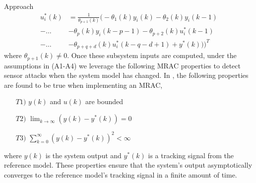 \begin{section}{Approach}
	\begin{equation}
	\begin{split}
	\label{eq:End}
	u^*_i(k)&=\frac{1}{\theta_{p+1}(k)}\big(-\theta_1(k)y_i(k)-\theta_2(k)y_i(k-1)  \\
    -\dots &-\theta_p(k)y_i(k-p-1)-\theta_{p+2}(k)u^*_i(k-1)  \\
	- \dots &- \theta_{p+q+d}(k)u^*_i(k-q-d+1) + y^*(k)) \big)^T
	\end{split}
	\end{equation}
where $\theta_{p+1}(k)\neq0 $. Once these subsystem inputs are computed, under the assumptions in (A1-A4) we leverage the following MRAC properties to detect sensor attacks when the system model has changed. In \cite{tao2003adaptive}, the following properties are found to be true when implementing an MRAC,
	\begin{enumerate}%
	\label{assumtions_ensure}
	\item[$T1)$] $y(k)$ and $u(k)$ are bounded 
	\item[$T2)$] $\lim_{k\to\infty}(y(k)-y^*(k))=0$
	\label{Truth2}
	\item[$T3)$] $\sum_{k=0}^\infty(y(k)-y^*(k))^2<\infty$
	\end{enumerate}
where $y(k)$ is the system output and $y^*(k)$ is a tracking signal from the reference model. These properties ensure that the system's output asymptotically converges to the reference model's tracking signal in a finite amount of time. 



\end{section}
